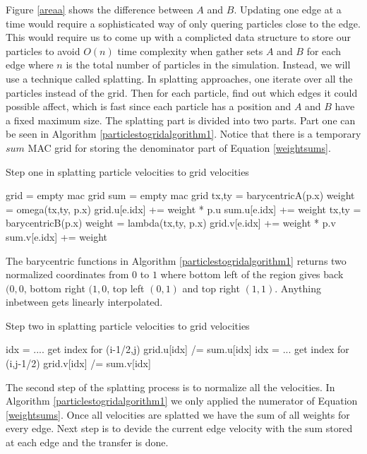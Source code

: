 Figure \ref{areaa} shows the difference between $A$ and $B$. Updating one edge at a time would require a sophisticated way of only quering particles close to the edge. This would require us to come up with a complicted data structure to store our particles to avoid $O(n)$ time complexity when gather sets $A$ and $B$ for each edge where $n$ is the total number of particles in the simulation. Instead, we will use a technique called splatting. In splatting approaches, one iterate over all the particles instead of the grid. Then for each particle, find out which edges it could possible affect, which is fast since each particle has a position and $A$ and $B$ have a fixed maximum size. The splatting part is divided into two parts. Part one can be seen in Algorithm \ref{particlestogridalgorithm1}. Notice that there is a temporary $sum$ MAC grid for storing the denominator part of Equation \ref{weightsums}.

\begin{algorithm}
\caption{Step one in splatting particle velocities to grid velocities}
\begin{algorithmic}
\STATE grid = empty mac grid
\STATE sum = empty mac grid
\STATE tx,ty = barycentricA(p.x)
\STATE weight = omega(tx,ty, p.x)
\STATE grid.u[e.idx] += weight * p.u
\STATE sum.u[e.idx] += weight
\ENDFOR
\STATE tx,ty = barycentricB(p.x)
\STATE weight = lambda(tx,ty, p.x)
\STATE grid.v[e.idx] += weight * p.v
\STATE sum.v[e.idx] += weight
\ENDFOR
\ENDFOR
\end{algorithmic}
\label{particlestogridalgorithm1}
\end{algorithm}

The barycentric functions in Algorithm \ref{particlestogridalgorithm1} returns two normalized coordinates from $0$ to $1$ where bottom left of the region gives back $(0,0$, bottom right $(1,0$, top left $(0,1)$ and top right $(1,1)$. Anything inbetween gets linearly interpolated.

\begin{algorithm}
\caption{Step two in splatting particle velocities to grid velocities}
\begin{algorithmic}
\STATE idx = .... get index for (i-1/2,j)
\STATE grid.u[idx] /= sum.u[idx]
\STATE idx = ... get index for (i,j-1/2)
\STATE grid.v[idx] /= sum.v[idx]
\ENDFOR
\ENDFOR
\end{algorithmic}
\label{particlestogridalgorithm2}
\end{algorithm}

The second step of the splatting process is to normalize all the velocities. In Algorithm \ref{particlestogridalgorithm1} we only applied the numerator of Equation \ref{weightsums}. Once all velocities are splatted we have the sum of all weights for every edge. Next step is  to devide the current edge velocity with the sum stored at each edge and the transfer is done.
